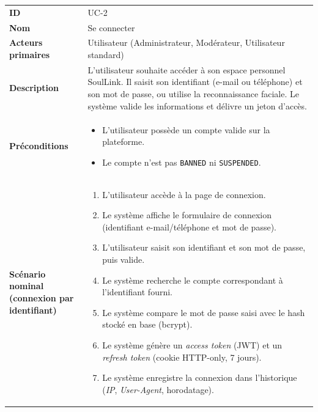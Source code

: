 \documentclass[12pt,a4paper]{report}
\begin{document}
\begin{center}
\renewcommand{\arraystretch}{1.5}
\begin{longtable}{|L{4cm}|L{11.5cm}|}
\hline
{}
 \\
\hline
\textbf{ID}               & UC-2 \\
\hline
\textbf{Nom}              & Se connecter \\
\hline
\textbf{Acteurs primaires} & Utilisateur (Administrateur, Modérateur, Utilisateur standard) \\
\hline
\textbf{Description}      & L'utilisateur souhaite accéder à son espace personnel SoulLink. Il saisit son identifiant (e-mail ou téléphone) et son mot de passe, ou utilise la reconnaissance faciale. Le système valide les informations et délivre un jeton d'accès. \\
\hline
\textbf{Préconditions}    &
\begin{itemize}
  \item L'utilisateur possède un compte valide sur la plateforme.
  \item Le compte n'est pas \texttt{BANNED} ni \texttt{SUSPENDED}.
\end{itemize} \\
\hline
\textbf{Scénario nominal \newline (connexion par identifiant)} &
\begin{enumerate}
  \item L'utilisateur accède à la page de connexion.
  \item Le système affiche le formulaire de connexion (identifiant e-mail/téléphone et mot de passe).
  \item L'utilisateur saisit son identifiant et son mot de passe, puis valide.
  \item Le système recherche le compte correspondant à l'identifiant fourni.
  \item Le système compare le mot de passe saisi avec le hash stocké en base (bcrypt).
  \item Le système génère un \textit{access token} (JWT) et un \textit{refresh token} (cookie HTTP-only, 7 jours).
  \item Le système enregistre la connexion dans l'historique (\textit{IP}, \textit{User-Agent}, horodatage).

\end{enumerate}
\end{longtable}
\end{center}
\end{document}
